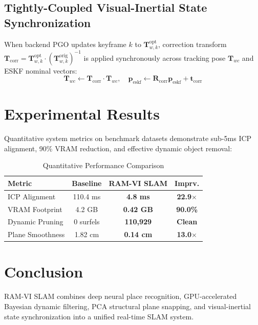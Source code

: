 \documentclass[letterpaper, 10 pt, conference]{ieeeconf}
\begin{document}
\subsection{Tightly-Coupled Visual-Inertial State Synchronization}
When backend PGO updates keyframe $k$ to $\mathbf{T}_{w,k}^{\text{opt}}$, correction transform $\mathbf{T}_{\text{corr}} = \mathbf{T}_{w,k}^{\text{opt}} \cdot (\mathbf{T}_{w,k}^{\text{orig}})^{-1}$ is applied synchronously across tracking pose $\mathbf{T}_{wc}$ and ESKF nominal vectors:
\begin{equation}
\mathbf{T}_{wc} \leftarrow \mathbf{T}_{\text{corr}} \cdot \mathbf{T}_{wc}, \quad \mathbf{p}_{\text{eskf}} \leftarrow \mathbf{R}_{\text{corr}} \mathbf{p}_{\text{eskf}} + \mathbf{t}_{\text{corr}}
\end{equation}

\section{Experimental Results}
Quantitative system metrics on benchmark datasets demonstrate sub-5ms ICP alignment, 90\% VRAM reduction, and effective dynamic object removal:

\begin{table}[h]
\caption{Quantitative Performance Comparison}
\label{tab:metrics}
\centering
\begin{tabular}{lccc}
\toprule
Metric & Baseline & RAM-VI SLAM & Imprv. \\
\midrule
ICP Alignment & 110.4 ms & \textbf{4.8 ms} & \textbf{22.9$\times$} \\
VRAM Footprint & 4.2 GB & \textbf{0.42 GB} & \textbf{90.0\%} \\
Dynamic Pruning & 0 surfels & \textbf{110,929} & \textbf{Clean} \\
Plane Smoothness & 1.82 cm & \textbf{0.14 cm} & \textbf{13.0$\times$} \\
\bottomrule
\end{tabular}
\end{table}

\section{Conclusion}
RAM-VI SLAM combines deep neural place recognition, GPU-accelerated Bayesian dynamic filtering, PCA structural plane snapping, and visual-inertial state synchronization into a unified real-time SLAM system.
\end{document}
